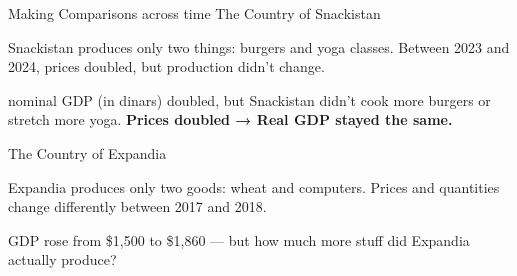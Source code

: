 \documentclass[10pt,aspectratio=169]{beamer}
\begin{document}
\begin{frame}{Making Comparisons across time}{ The Country of Snackistan}

Snackistan produces only two things: burgers and yoga classes.  
Between 2023 and 2024, prices doubled, but production didn’t change.

\begin{table}
\end{table}


nominal GDP (in dinars) doubled, but Snackistan didn’t cook more burgers or stretch more yoga.  
\textbf{Prices doubled → Real GDP stayed the same.}
\end{frame}

\begin{frame}{The Country of Expandia}

Expandia produces only two goods: wheat and computers.  
Prices and quantities change differently between 2017 and 2018.

\begin{table}
\end{table}

GDP rose from \$1,500 to \$1,860 — but how much more stuff did Expandia actually produce?

\end{frame}
\end{document}
